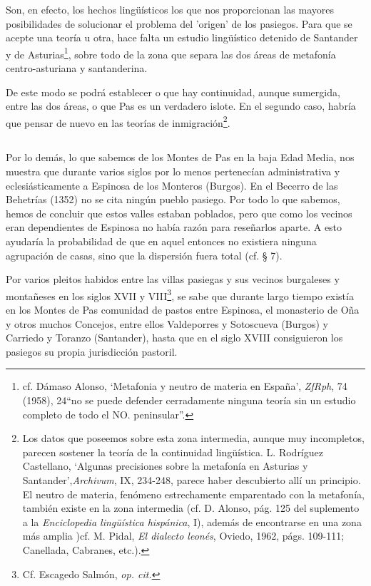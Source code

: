 \documentclass[11pt,spanish,b5paper]{book}
\begin{document}
Son, en efecto, los hechos lingüísticos los que nos proporcionan las mayores posibilidades de solucionar el problema del 'origen' de los pasiegos. Para que se acepte una teoría u otra, hace falta un estudio lingüístico detenido de Santander y de Asturias\footnote{cf. Dámaso Alonso, `Metafonia y neutro de materia en España', \emph{ZfRph}, 74 (1958), 24``no se puede defender cerradamente ninguna teoría sin un estudio completo de todo el NO. peninsular''.}, sobre todo de la zona que separa las dos áreas de metafonía centro-asturiana y santanderina.

De este modo se podrá establecer o que hay continuidad, aunque sumergida, entre las dos áreas, o que Pas es un verdadero islote. En el segundo caso, habría que pensar de nuevo en las teorías de inmigración\footnote{Los datos que poseemos sobre esta zona intermedia, aunque muy incompletos, parecen sostener la teoría de la continuidad lingüística. L. Rodríguez Castellano, `Algunas precisiones sobre la metafonía en Asturias y Santander',\emph{Archivum}, IX, 234-248, parece haber descubierto allí un principio. El neutro de materia, fenómeno estrechamente emparentado con la metafonía, también existe en la zona intermedia (cf. D. Alonso, pág. 125 del suplemento  a la \emph{Enciclopedia lingüística hispánica}, I), además de encontrarse en una zona más amplia )cf. M. Pidal, \emph{El dialecto leonés}, Oviedo, 1962, págs. 109-111; Canellada, Cabranes, etc.).}.

\subsection{} Por lo demás, lo que sabemos de los Montes de Pas en la baja Edad Media, nos muestra que durante varios siglos por lo menos pertenecían administrativa y eclesiásticamente a Espinosa de los Monteros (Burgos). En el Becerro de las Behetrías (1352) no se cita ningún pueblo pasiego. Por todo lo que sabemos, hemos de concluir que estos valles estaban poblados, pero que como los vecinos eran dependientes de Espinosa no había razón para reseñarlos aparte. A esto ayudaría la probabilidad de que en aquel entonces no existiera ninguna agrupación de casas, sino que la dispersión fuera total (cf. § 7).

Por varios pleitos habidos entre las villas pasiegas y sus vecinos burgaleses y montañeses en los siglos XVII y VIII\footnote{Cf. Escagedo Salmón, \emph{op. cit.}}, se sabe que durante largo tiempo existía en los Montes de Pas comunidad de pastos entre Espinosa, el monasterio de Oña y otros muchos Concejos, entre ellos Valdeporres y Sotoscueva (Burgos) y Carriedo y Toranzo (Santander), hasta que en el siglo XVIII consiguieron los pasiegos su propia jurisdicción pastoril.
\end{document}
